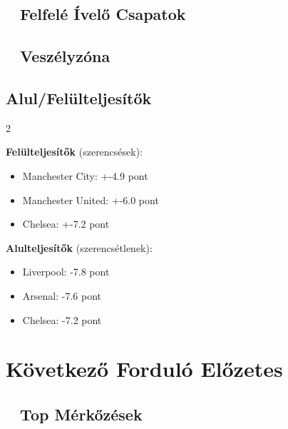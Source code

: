 \documentclass[11pt,a4paper]{article}
\begin{document}
\subsection*{\faArrowUp~ Felfelé Ívelő Csapatok}

\begin{tcolorbox}[colback=green!5,colframe=green!40]
\end{tcolorbox}

\subsection*{\faExclamationTriangle~ Veszélyzóna}

\begin{tcolorbox}[colback=red!5,colframe=red!40]
\end{tcolorbox}

\subsection*{Alul/Felülteljesítők}

\begin{multicols}{2}

\textbf{Felülteljesítők} (szerencsések):
\begin{itemize}
    \item Manchester City: +-4.9 pont
    \item Manchester United: +-6.0 pont
    \item Chelsea: +-7.2 pont
\end{itemize}

\columnbreak

\textbf{Alulteljesítők} (szerencsétlenek):
\begin{itemize}
    \item Liverpool: -7.8 pont
    \item Arsenal: -7.6 pont
    \item Chelsea: -7.2 pont
\end{itemize}

\end{multicols}

\newpage

\section*{Következő Forduló Előzetes}

\subsection*{\faCalendar~ Top Mérkőzések}
\end{document}
